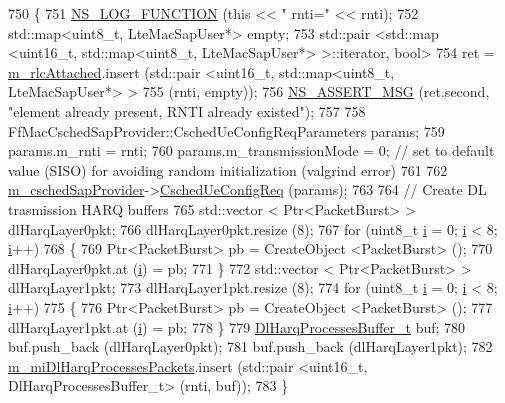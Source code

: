 \begin{DoxyCode}
750 \{
751   \hyperlink{log-macros-disabled_8h_a90b90d5bad1f39cb1b64923ea94c0761}{NS\_LOG\_FUNCTION} (\textcolor{keyword}{this} << \textcolor{stringliteral}{" rnti="} << rnti);
752   std::map<uint8\_t, LteMacSapUser*> empty;
753   std::pair <std::map <uint16\_t, std::map<uint8\_t, LteMacSapUser*> >::iterator, \textcolor{keywordtype}{bool}> 
754     ret = \hyperlink{classns3_1_1LteEnbMac_a5de3f3cae1cbc8438a7fdc5cd173a821}{m\_rlcAttached}.insert (std::pair <uint16\_t,  std::map<uint8\_t, LteMacSapUser*> > 
755                                 (rnti, empty));
756   \hyperlink{assert_8h_aff5ece9066c74e681e74999856f08539}{NS\_ASSERT\_MSG} (ret.second, \textcolor{stringliteral}{"element already present, RNTI already existed"});
757 
758   FfMacCschedSapProvider::CschedUeConfigReqParameters params;
759   params.m\_rnti = rnti;
760   params.m\_transmissionMode = 0; \textcolor{comment}{// set to default value (SISO) for avoiding random initialization
       (valgrind error)}
761 
762   \hyperlink{classns3_1_1LteEnbMac_a0d1bd5af32f8b78f2c8ff493560d3fca}{m\_cschedSapProvider}->\hyperlink{classns3_1_1FfMacCschedSapProvider_a104a8ccff3678bcd34548ea574c380dd}{CschedUeConfigReq} (params);
763 
764   \textcolor{comment}{// Create DL trasmission HARQ buffers}
765   std::vector < Ptr<PacketBurst> > dlHarqLayer0pkt;
766   dlHarqLayer0pkt.resize (8);
767   \textcolor{keywordflow}{for} (uint8\_t \hyperlink{bernuolliDistribution_8m_a6f6ccfcf58b31cb6412107d9d5281426}{i} = 0; \hyperlink{bernuolliDistribution_8m_a6f6ccfcf58b31cb6412107d9d5281426}{i} < 8; \hyperlink{bernuolliDistribution_8m_a6f6ccfcf58b31cb6412107d9d5281426}{i}++)
768     \{
769       Ptr<PacketBurst> pb = CreateObject <PacketBurst> ();
770       dlHarqLayer0pkt.at (\hyperlink{bernuolliDistribution_8m_a6f6ccfcf58b31cb6412107d9d5281426}{i}) = pb;
771     \}
772   std::vector < Ptr<PacketBurst> > dlHarqLayer1pkt;
773   dlHarqLayer1pkt.resize (8);
774   \textcolor{keywordflow}{for} (uint8\_t \hyperlink{bernuolliDistribution_8m_a6f6ccfcf58b31cb6412107d9d5281426}{i} = 0; \hyperlink{bernuolliDistribution_8m_a6f6ccfcf58b31cb6412107d9d5281426}{i} < 8; \hyperlink{bernuolliDistribution_8m_a6f6ccfcf58b31cb6412107d9d5281426}{i}++)
775     \{
776       Ptr<PacketBurst> pb = CreateObject <PacketBurst> ();
777       dlHarqLayer1pkt.at (\hyperlink{bernuolliDistribution_8m_a6f6ccfcf58b31cb6412107d9d5281426}{i}) = pb;
778     \}
779   \hyperlink{namespacens3_aa3c4d208d1d07a2cfcf9c09e4ae4c5af}{DlHarqProcessesBuffer\_t} buf;
780   buf.push\_back (dlHarqLayer0pkt);
781   buf.push\_back (dlHarqLayer1pkt);
782   \hyperlink{classns3_1_1LteEnbMac_aaf60e2fb6f8326eeebbdec6b7e7054da}{m\_miDlHarqProcessesPackets}.insert (std::pair <uint16\_t,
       DlHarqProcessesBuffer\_t> (rnti, buf));
783 \}
\end{DoxyCode}



